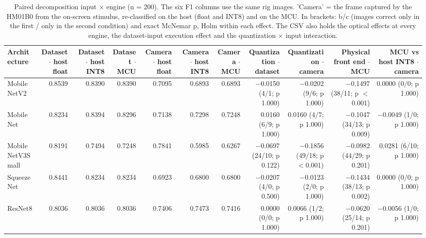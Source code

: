 \begin{table}[htbp]
\centering
\scriptsize
\caption{Paired decomposition input $\times$ engine (n = 200). The six F1 columns use the same rig images. 'Camera' = the frame captured by the HM01B0 from the on-screen stimulus, re-classified on the host (float and INT8) and on the MCU. In brackets: b/c (images correct only in the first / only in the second condition) and exact McNemar p, Holm within each effect. The CSV also holds the optical effects at every engine, the dataset-input execution effect and the quantization $\times$ input interaction.}
\label{tab:ladder-coco-2}
\begin{tabular}{lrrrrrrrrrr}
\toprule
Architecture & Dataset $\cdot$ host float & Dataset $\cdot$ host INT8 & Dataset $\cdot$ MCU & Camera $\cdot$ host float & Camera $\cdot$ host INT8 & Camera $\cdot$ MCU & Quantization $\cdot$ dataset & Quantization $\cdot$ camera & Physical front end $\cdot$ MCU & MCU vs host INT8 $\cdot$ camera \\
\midrule
MobileNetV2 & 0.8539 & 0.8390 & 0.8390 & 0.7095 & 0.6893 & 0.6893 & $-$0.0150 (4/1; p 1.000) & $-$0.0202 (9/6; p 1.000) & $-$0.1497 (38/11; p $<$0.001) & 0.0000 (0/0; p 1.000) \\
MobileNet & 0.8234 & 0.8394 & 0.8296 & 0.7138 & 0.7298 & 0.7248 & 0.0160 (6/9; p 1.000) & 0.0160 (4/7; p 1.000) & $-$0.1047 (34/13; p 0.009) & $-$0.0049 (1/0; p 1.000) \\
MobileNetV3Small & 0.8191 & 0.7494 & 0.7248 & 0.7841 & 0.5985 & 0.6267 & $-$0.0697 (24/10; p 0.122) & $-$0.1856 (49/18; p $<$0.001) & $-$0.0982 (44/29; p 0.201) & 0.0281 (6/10; p 1.000) \\
SqueezeNet & 0.8441 & 0.8234 & 0.8234 & 0.6923 & 0.6800 & 0.6800 & $-$0.0207 (4/0; p 0.500) & $-$0.0123 (2/0; p 1.000) & $-$0.1434 (38/13; p 0.002) & 0.0000 (0/0; p 1.000) \\
ResNet8 & 0.8036 & 0.8036 & 0.8036 & 0.7406 & 0.7473 & 0.7416 & 0.0000 (0/0; p 1.000) & 0.0066 (1/2; p 1.000) & $-$0.0620 (25/14; p 0.201) & $-$0.0056 (1/0; p 1.000) \\
\bottomrule
\end{tabular}
\end{table}

